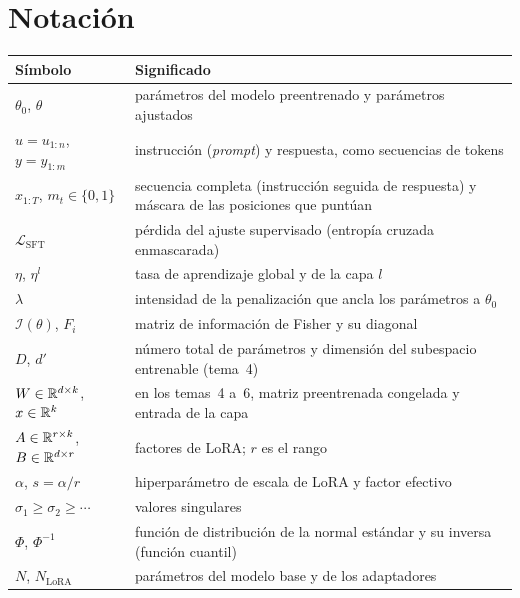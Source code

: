 \documentclass[11pt,a4paper,twoside,openany]{book}
\newcommand{\Lsft}{\mathcal{L}_{\mathrm{SFT}}}
\newcommand{\Fis}{\mathcal{I}}
\begin{document}
\section*{Notación}
\begin{center}\small
\begin{tabularx}{\textwidth}{@{}l>{\raggedright\arraybackslash}X@{}}
\toprule
Símbolo & Significado \\
\midrule
$\theta_0$, $\theta$ & parámetros del modelo preentrenado y parámetros ajustados \\
$u=u_{1:n}$, $y=y_{1:m}$ & instrucción (\emph{prompt}) y respuesta, como secuencias de tokens \\
$x_{1:T}$, $m_t\in\{0,1\}$ & secuencia completa (instrucción seguida de respuesta) y máscara de las posiciones que puntúan \\
$\Lsft$ & pérdida del ajuste supervisado (entropía cruzada enmascarada) \\
$\eta$, $\eta^{l}$ & tasa de aprendizaje global y de la capa $l$ \\
$\lambda$ & intensidad de la penalización que ancla los parámetros a $\theta_0$ \\
$\Fis(\theta)$, $F_i$ & matriz de información de Fisher y su diagonal \\
$D$, $d'$ & número total de parámetros y dimensión del subespacio entrenable (tema~4) \\
$W\in\mathbb{R}^{d\times k}$, $x\in\mathbb{R}^{k}$ & en los temas~4 a~6, matriz preentrenada congelada y entrada de la capa \\
$A\in\mathbb{R}^{r\times k}$, $B\in\mathbb{R}^{d\times r}$ & factores de LoRA; $r$ es el rango \\
$\alpha$, $s=\alpha/r$ & hiperparámetro de escala de LoRA y factor efectivo \\
$\sigma_1\ge\sigma_2\ge\cdots$ & valores singulares \\
$\Phi$, $\Phi^{-1}$ & función de distribución de la normal estándar y su inversa (función cuantil) \\
$N$, $N_{\mathrm{LoRA}}$ & parámetros del modelo base y de los adaptadores \\
\bottomrule
\end{tabularx}
\end{center}

\tableofcontents

\mainmatter







\appendix


\backmatter

\end{document}
